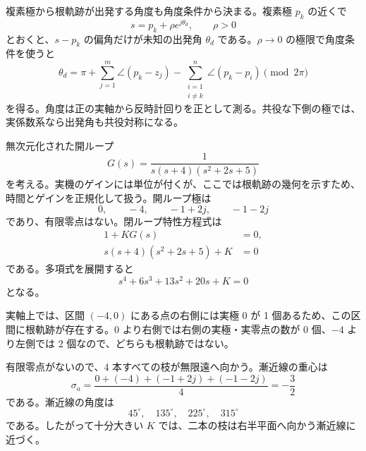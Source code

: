 複素極から根軌跡が出発する角度も角度条件から決まる。複素極 $p_k$ の近くで
\begin{equation}
  s=p_k+\rho e^{j\theta_d},
  \qquad \rho>0
\end{equation}
とおくと、$s-p_k$ の偏角だけが未知の出発角 $\theta_d$ である。$\rho\to0$ の極限で角度条件を使うと
\begin{equation}
  \theta_d
  =\pi
  +\sum_{j=1}^{m}\angle(p_k-z_j)
  -\sum_{\substack{i=1\\i\ne k}}^{n}\angle(p_k-p_i)
  \pmod{2\pi}
\end{equation}
を得る。角度は正の実軸から反時計回りを正として測る。共役な下側の極では、実係数系なら出発角も共役対称になる。

\begin{example}[複素極を含む四次系の根軌跡]
無次元化された開ループ
\begin{equation}
  G(s)=\frac{1}{s(s+4)(s^2+2s+5)}
\end{equation}
を考える。実機のゲインには単位が付くが、ここでは根軌跡の幾何を示すため、時間とゲインを正規化して扱う。開ループ極は
\begin{equation}
  0,\qquad -4,\qquad -1+2j,\qquad -1-2j
\end{equation}
であり、有限零点はない。閉ループ特性方程式は
\begin{align}
  1+KG(s)&=0,\\
  s(s+4)(s^2+2s+5)+K&=0
\end{align}
である。多項式を展開すると
\begin{equation}
  s^4+6s^3+13s^2+20s+K=0
\end{equation}
となる。

実軸上では、区間 $(-4,0)$ にある点の右側には実極 $0$ が 1 個あるため、この区間に根軌跡が存在する。$0$ より右側では右側の実極・実零点の数が 0 個、$-4$ より左側では 2 個なので、どちらも根軌跡ではない。

有限零点がないので、4 本すべての枝が無限遠へ向かう。漸近線の重心は
\begin{equation}
  \sigma_a=
  \frac{0+(-4)+(-1+2j)+(-1-2j)}{4}
  =-\frac{3}{2}
\end{equation}
である。漸近線の角度は
\begin{equation}
  45^\circ,\quad 135^\circ,\quad 225^\circ,\quad 315^\circ
\end{equation}
である。したがって十分大きい $K$ では、二本の枝は右半平面へ向かう漸近線に近づく。


\end{example}
